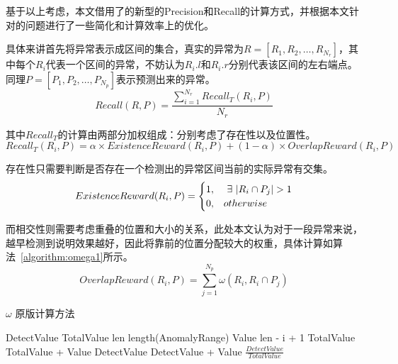 基于以上考虑，本文借用了\cite{tatbul2018precision}的新型的Precision和Recall的计算方式，并根据本文针对的问题进行了一些简化和计算效率上的优化。

具体来讲首先将异常表示成区间的集合，真实的异常为$R=[R_1,R_2,\dots,R_{N_r}]$，其中每个$R_i$代表一个区间的异常，不妨认为$R_i.l$和$R_i.r$分别代表该区间的左右端点。同理$P=[P_1,P_2,\dots,P_{N_p}]$表示预测出来的异常。
\begin{equation*}
  Recall(R,P) = \frac{\sum\limits_{i=1}^{N_r} Recall_T(R_i,P)}{N_r}
\end{equation*}

其中$Recall_T$的计算由两部分加权组成：分别考虑了存在性以及位置性。
\begin{equation*}
  Recall_T(R_i,P) = \alpha \times ExistenceReward(R_i,P) + (1-\alpha) \times OverlapReward (R_i,P)
\end{equation*}

存在性只需要判断是否存在一个检测出的异常区间当前的实际异常有交集。
\begin{equation*}
ExistenceReward(R_i,P) = \begin{cases} 1, & \ \exists \  | R_i \cap P_j|>1 \cr 0, & otherwise \end{cases}
\end{equation*}

而相交性则需要考虑重叠的位置和大小的关系，此处本文认为对于一段异常来说，越早检测到说明效果越好，因此将靠前的位置分配较大的权重，具体计算如算法~\ref{algorithm:omega1}所示。
\begin{equation*}
  OverlapReward(R_i,P) = \sum\limits_{j=1}^{N_p}\omega(R_i,R_i\cap P_j)
\end{equation*}
\begin{algorithm}
  \caption{$\omega$ 原版计算方法\cite{tatbul2018precision}}
  \begin{algorithmic}[1]
      \State DetectValue 
      \State TotalValue 
      \State len \gets length(AnomalyRange)
          \State Value \gets len - i + 1
          \State TotalValue \gets TotalValue + Value
              \State DetectValue \gets DetectValue + Value
          \EndIf
      \EndFor
      \State \Return $\frac{DetectValue}{TotalValue}$
      \EndFunction
  \end{algorithmic}
  \label{algorithm:omega1}
\end{algorithm}

